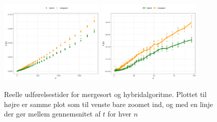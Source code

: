 \begin{figure}
	\begin{center}
		\includegraphics[width=0.45\textwidth]{../img/toMergesort.png}
		\includegraphics[width=0.45\textwidth]{../img/toMergesortZoomed.png}
	\end{center}
	\caption{Reelle udførelsestider for mergesort og hybridalgoritme. Plottet til højre er samme plot som til venste bare zoomet ind, og med en linje der gør mellem gennemsnitet af $t$ for hver $n$}
	\label{fig:Mergesort og Hybridalgoritme}
\end{figure}


